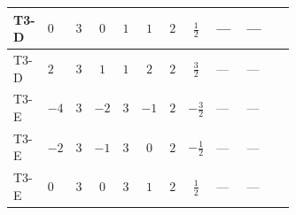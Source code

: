 \documentclass[8pt]{article}
\begin{document}
\begin{landscape}
\begin{longtable}{@{}llcccccc >{\raggedright\arraybackslash}p{0.21\linewidth} >{\raggedright\arraybackslash}p{0.21\linewidth} >{\raggedright\arraybackslash}p{0.21\linewidth}@{}}
\midrule
T3-D & $0$ & $3$ & $0$ & $1$ & $1$ & $2$ & $\frac{1}{2}$ & --- & --- & \scriptsize\adjustbox{max width=\linewidth}{$\begin{gathered} {\lambda_{HS_1}^{(1)}} (2 T_{\nu}^{(1)}+6 \operatorname{Tr}\!\left({Y_d}\,\left({Y_d}\right)^{\dagger}\right)+2 \operatorname{Tr}\!\left({Y_e}\,\left({Y_e}\right)^{\dagger}\right)+6 \operatorname{Tr}\!\left({Y_u}\,\left({Y_u}\right)^{\dagger}\right)+4 {\lambda_{S_1}^{(A)}})\end{gathered}$} \\
\midrule
T3-D & $2$ & $3$ & $1$ & $1$ & $2$ & $2$ & $\frac{3}{2}$ & --- & --- & \scriptsize\adjustbox{max width=\linewidth}{$\begin{gathered} {\lambda_{HS_1}^{(1)}} (2 T_{\nu}^{(1)}+6 \operatorname{Tr}\!\left({Y_d}\,\left({Y_d}\right)^{\dagger}\right)+2 \operatorname{Tr}\!\left({Y_e}\,\left({Y_e}\right)^{\dagger}\right)+6 \operatorname{Tr}\!\left({Y_u}\,\left({Y_u}\right)^{\dagger}\right)+4 {\lambda_{S_1}^{(A)}})\end{gathered}$} \\
\midrule
T3-E & $-4$ & $3$ & $-2$ & $3$ & $-1$ & $2$ & $-\frac{3}{2}$ & --- & --- & \scriptsize\adjustbox{max width=\linewidth}{$\begin{gathered} {\lambda_{HS_1}^{(1)}} (2 T_{\nu}^{(1)}+6 \operatorname{Tr}\!\left({Y_d}\,\left({Y_d}\right)^{\dagger}\right)+2 \operatorname{Tr}\!\left({Y_e}\,\left({Y_e}\right)^{\dagger}\right)+6 \operatorname{Tr}\!\left({Y_u}\,\left({Y_u}\right)^{\dagger}\right)+4 {\lambda_{S_1}^{(A)}})\end{gathered}$} \\
\midrule
T3-E & $-2$ & $3$ & $-1$ & $3$ & $0$ & $2$ & $-\frac{1}{2}$ & --- & --- & \scriptsize\adjustbox{max width=\linewidth}{$\begin{gathered} {\lambda_{HS_1}^{(1)}} (2 T_{\nu}^{(1)}+6 \operatorname{Tr}\!\left({Y_d}\,\left({Y_d}\right)^{\dagger}\right)+2 \operatorname{Tr}\!\left({Y_e}\,\left({Y_e}\right)^{\dagger}\right)+6 \operatorname{Tr}\!\left({Y_u}\,\left({Y_u}\right)^{\dagger}\right)+4 {\lambda_{S_1}^{(A)}})\end{gathered}$} \\
\midrule
T3-E & $0$ & $3$ & $0$ & $3$ & $1$ & $2$ & $\frac{1}{2}$ & --- & --- & \scriptsize\adjustbox{max width=\linewidth}{$\begin{gathered} {\lambda_{HS_1}^{(1)}} (2 T_{\nu}^{(1)}+6 \operatorname{Tr}\!\left({Y_d}\,\left({Y_d}\right)^{\dagger}\right)+2 \operatorname{Tr}\!\left({Y_e}\,\left({Y_e}\right)^{\dagger}\right)+6 \operatorname{Tr}\!\left({Y_u}\,\left({Y_u}\right)^{\dagger}\right)+4 {\lambda_{S_1}^{(A)}})\end{gathered}$} \\

\end{longtable}
\end{landscape}
\end{document}
